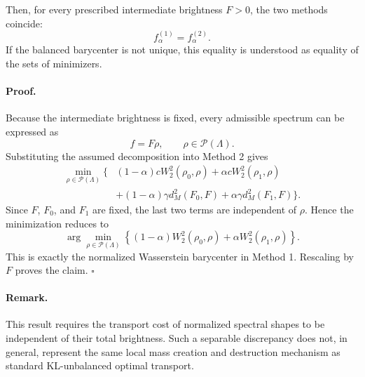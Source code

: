 \documentclass{article}
\begin{document}
Then, for every prescribed intermediate brightness $F>0$,
the two methods coincide:
\begin{equation}
\boxed{
f_\alpha^{(1)}=f_\alpha^{(2)}.
}
\end{equation}
If the balanced barycenter is not unique, this equality
is understood as equality of the sets of minimizers.

\paragraph{Proof.}
Because the intermediate brightness is fixed, every
admissible spectrum can be expressed as
\[
f=F\rho,
\qquad
\rho\in\mathcal P(\Lambda).
\]
Substituting the assumed decomposition into Method 2 gives
\begin{align}
\min_{\rho\in\mathcal P(\Lambda)}
\Big\{
&(1-\alpha)cW_2^2(\rho_0,\rho)
+\alpha cW_2^2(\rho_1,\rho)
\nonumber\\
&+(1-\alpha)\gamma d_M^2(F_0,F)
+\alpha\gamma d_M^2(F_1,F)
\Big\}.
\end{align}
Since $F$, $F_0$, and $F_1$ are fixed, the last two terms
are independent of $\rho$. Hence the minimization reduces to
\begin{equation}
\arg\min_{\rho\in\mathcal P(\Lambda)}
\left\{
(1-\alpha)W_2^2(\rho_0,\rho)
+
\alpha W_2^2(\rho_1,\rho)
\right\}.
\end{equation}
This is exactly the normalized Wasserstein barycenter
in Method 1. Rescaling by $F$ proves the claim.
\hfill$\square$

\paragraph{Remark.}
This result requires the transport cost of normalized
spectral shapes to be independent of their total brightness.
Such a separable discrepancy does not, in general,
represent the same local mass creation and destruction
mechanism as standard KL-unbalanced optimal transport.


\end{document}

